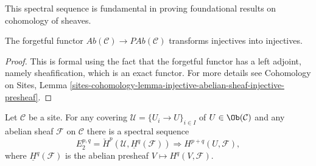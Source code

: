 \noindent
This spectral sequence is fundamental in proving foundational results on
cohomology of sheaves.

\begin{lemma}
\label{lemma-forget-injectives}
The forgetful functor $\textit{Ab}(\mathcal{C})\to \textit{PAb}(\mathcal{C})$
transforms injectives into injectives.
\end{lemma}

\begin{proof}
This is formal using the fact that the forgetful functor has a left adjoint,
namely sheafification, which is an exact functor. For more details see
Cohomology on Sites,
Lemma \ref{sites-cohomology-lemma-injective-abelian-sheaf-injective-presheaf}.
\end{proof}

\begin{theorem}
\label{theorem-cech-ss}
Let $\mathcal{C}$ be a site. For any covering
$\mathcal{U} = \{U_i \to U\}_{i \in I}$ of $U \in \Ob(\mathcal{C})$
and any abelian sheaf $\mathcal{F}$ on $\mathcal{C}$
there is a spectral sequence
$$
E_2^{p, q}
=
\check H^p(\mathcal{U}, \underline{H}^q(\mathcal{F}))
\Rightarrow
H^{p+q}(U, \mathcal{F}),
$$
where $\underline{H}^q(\mathcal{F})$ is the abelian presheaf
$V \mapsto H^q(V, \mathcal{F})$.
\end{theorem}

